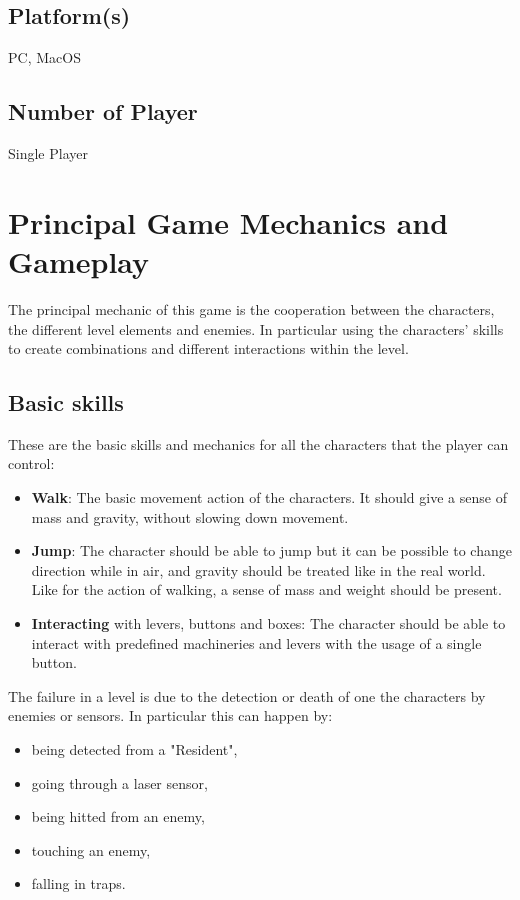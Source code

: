 \documentclass[12pt, a4paper]{report}
\begin{document}
\section*{Platform(s)}
PC, MacOS
\section*{Number of Player}
Single Player

\chapter{Principal Game Mechanics and Gameplay}
The principal mechanic of this game is the cooperation between the characters, the different level elements and enemies. In particular using the characters’ skills to create combinations and different interactions within the level.

\section*{Basic skills}
These are the basic skills and mechanics for all the characters that the player can control:
\begin{itemize}
	\item \textbf{Walk}: The basic movement action of the characters. It should give a sense of mass and gravity, without slowing down movement.
	\item \textbf{Jump}: The character should be able to jump but it can be possible to change direction while in air, and gravity should be treated like in the 		real world. Like for the action of walking, a sense of mass and weight should be present. 
	\item \textbf{Interacting} with levers, buttons and boxes: The character should be able to interact with predefined machineries and levers with the usage 	of a single button.
\end{itemize}

The failure in a level is due to the detection or death of one the characters by enemies or sensors. In particular this can happen by:
\begin{itemize}
	\item being detected from a "Resident",
	\item going through a laser sensor,
	\item being hitted from an enemy,
	\item touching an enemy,
	\item falling in traps.
\end{itemize}
\end{document}
